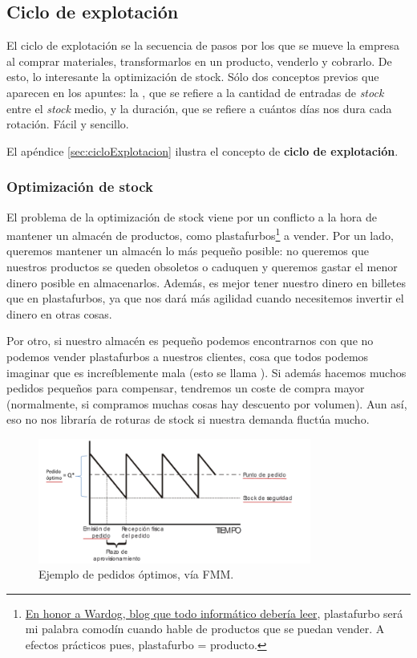 \documentclass[nochap,palatino,shortheader]{apuntes}
\begin{document}
\subsection{Ciclo de explotación}

El ciclo de explotación se la secuencia de pasos por los que se mueve la empresa al comprar materiales, transformarlos en un producto, venderlo y cobrarlo. De esto, lo interesante la optimización de stock. Sólo dos conceptos previos que aparecen en los apuntes: la , que se refiere a la cantidad de entradas de \textit{stock} entre el \textit{stock} medio, y la duración, que se refiere a cuántos días nos dura cada rotación. Fácil y sencillo.

El apéndice \ref{sec:cicloExplotacion} ilustra el concepto de \textbf{ciclo de explotación}.

\subsubsection{Optimización de stock}

El problema de la optimización de stock viene por un conflicto a la hora de mantener un almacén de productos, como plastafurbos\footnote{\href{http://mundowdg.com/blog/2009/04/16/adioshola/}{En honor a Wardog, blog que todo informático debería leer}, plastafurbo será mi palabra comodín cuando hable de productos que se puedan vender. A efectos prácticos pues, plastafurbo = producto.} a vender. Por un lado, queremos mantener un almacén lo más pequeño posible: no queremos que nuestros productos se queden obsoletos o caduquen y queremos gastar el menor dinero posible en almacenarlos. Además, es mejor tener nuestro dinero en billetes que en plastafurbos, ya que nos dará más agilidad cuando necesitemos invertir el dinero en otras cosas.

Por otro, si nuestro almacén es pequeño podemos encontrarnos con que no podemos vender plastafurbos a nuestros clientes, cosa que todos podemos imaginar que es increíblemente mala (esto se llama ). Si además hacemos muchos pedidos pequeños para compensar, tendremos un coste de compra mayor (normalmente, si compramos muchas cosas hay descuento por volumen). Aun así, eso no nos libraría de roturas de stock si nuestra demanda fluctúa mucho.

\begin{figure}[hbtp]
\centering
\includegraphics[width=0.8\textwidth]{img/ControlStock.png}
\caption{Ejemplo de pedidos óptimos, vía FMM.}
\label{fig:StockDeterminista}
\end{figure}
\end{document}

